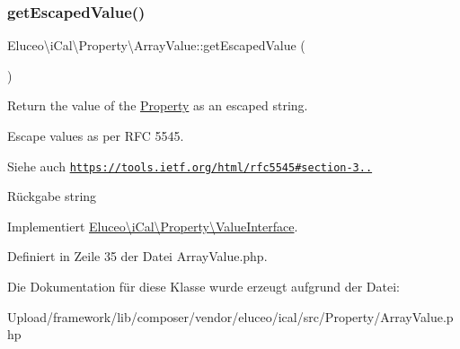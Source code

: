 \subsubsection{\texorpdfstring{get\+Escaped\+Value()}{getEscapedValue()}\hspace{0.1cm}{\footnotesize\ttfamily [3/3]}}
{\footnotesize\ttfamily Eluceo\textbackslash{}i\+Cal\textbackslash{}\+Property\textbackslash{}\+Array\+Value\+::get\+Escaped\+Value (\begin{DoxyParamCaption}{ }\end{DoxyParamCaption})}

Return the value of the \mbox{\hyperlink{class_eluceo_1_1i_cal_1_1_property}{Property}} as an escaped string.

Escape values as per R\+FC 5545.

\begin{DoxySeeAlso}{Siehe auch}
\href{https://tools.ietf.org/html/rfc5545#section-3.3.11}{\tt https\+://tools.\+ietf.\+org/html/rfc5545\#section-\/3..}
\end{DoxySeeAlso}
\begin{DoxyReturn}{Rückgabe}
string 
\end{DoxyReturn}


Implementiert \mbox{\hyperlink{interface_eluceo_1_1i_cal_1_1_property_1_1_value_interface_a408412ae5d11fd3f239c7985aede8c32}{Eluceo\textbackslash{}i\+Cal\textbackslash{}\+Property\textbackslash{}\+Value\+Interface}}.



Definiert in Zeile 35 der Datei Array\+Value.\+php.



Die Dokumentation für diese Klasse wurde erzeugt aufgrund der Datei\+:\begin{DoxyCompactItemize}
\item 
Upload/framework/lib/composer/vendor/eluceo/ical/src/\+Property/Array\+Value.\+php\end{DoxyCompactItemize}
